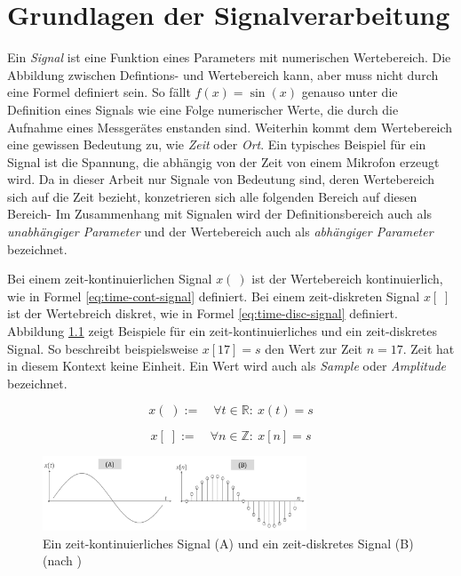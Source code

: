 \chapter{Grundlagen der Signalverarbeitung}
\label{sec:signalFoundations}

Ein \emph{Signal} ist eine Funktion eines Parameters mit numerischen Wertebereich. Die Abbildung zwischen Defintions- und Wertebereich kann, aber muss nicht durch eine Formel definiert sein. So fällt $f(x) = \sin( x )$ genauso unter die Definition eines Signals wie eine Folge numerischer Werte, die durch die Aufnahme eines Messgerätes enstanden sind. Weiterhin kommt dem Wertebereich eine gewissen Bedeutung zu, wie \emph{Zeit} oder \emph{Ort}. Ein typisches Beispiel für ein Signal ist die Spannung, die abhängig von der Zeit von einem Mikrofon erzeugt wird.  Da in dieser Arbeit nur Signale von Bedeutung sind, deren Wertebereich sich auf die Zeit bezieht, konzetrieren sich alle folgenden Bereich auf diesen Bereich- Im Zusammenhang mit Signalen wird der Definitionsbereich auch als \emph{unabhängiger Parameter} und der Wertebereich auch als \emph{abhängiger Parameter} bezeichnet. \cite[S. 11-12]{dspGuide} \cite[S. 22-23]{dspMichigan}

\medskip

 Bei einem zeit-kontinuierlichen Signal $x( \: )$ ist der Wertebereich kontinuierlich, wie in Formel  \ref{eq:time-cont-signal} definiert. Bei einem zeit-diskreten Signal $x[\;]$ ist der Wertebreich diskret, wie in Formel \ref{eq:time-disc-signal} definiert. Abbildung \ref{img:aSignal} zeigt Beispiele für ein zeit-kontinuierliches und ein zeit-diskretes Signal.  So beschreibt beispielsweise $x[17] = s$ den Wert zur Zeit $n = 17$. \glqq Zeit\grqq{} hat in diesem Kontext keine Einheit. Ein Wert wird auch als \emph{Sample} oder \emph{Amplitude} bezeichnet. \cite[S. 22 - 23]{dspMichigan}

 \begin{equation}
x(\;) := \quad \forall t \in \mathbb{R} :\ x(t) = s
\label{eq:time-cont-signal}
\end{equation}


\begin{equation}
x[\;] := \quad  \forall n \in \mathbb{Z} :\ x[n] = s
\label{eq:time-disc-signal}
\end{equation}

\begin{figure}
	\centering
	\includegraphics[width=0.7\textwidth]{bilder/aSignal04.png}
	\caption{Ein zeit-kontinuierliches Signal (A) und ein zeit-diskretes Signal (B) (nach \cite[S. 22]{dspMichigan})}
	\label{img:aSignal}
\end{figure}

